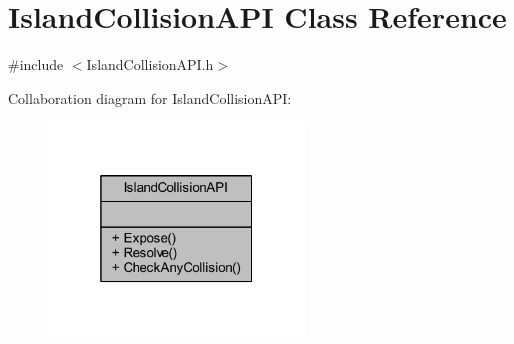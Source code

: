 \hypertarget{class_island_collision_a_p_i}{}\section{Island\+Collision\+A\+PI Class Reference}
\label{class_island_collision_a_p_i}


{\ttfamily \#include $<$Island\+Collision\+A\+P\+I.\+h$>$}



Collaboration diagram for Island\+Collision\+A\+PI\+:\nopagebreak
\begin{figure}[H]
\begin{center}
\leavevmode
\includegraphics[width=193pt]{class_island_collision_a_p_i__coll__graph}
\end{center}
\end{figure}
